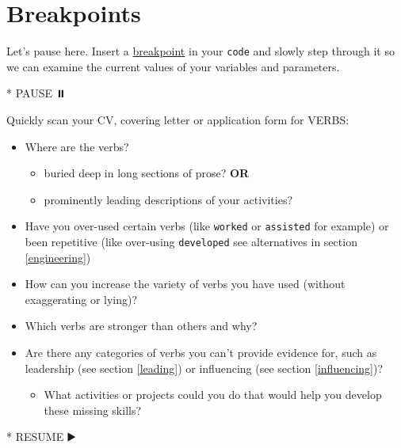 \documentclass[
]{book}
\newenvironment{Shaded}{\begin{snugshade}}{\end{snugshade}}
\newcommand{\NormalTok}[1]{#1}
\newcommand{\SpecialStringTok}[1]{\textcolor[rgb]{0.31,0.60,0.02}{#1}}
\providecommand{\tightlist}{%
  \setlength{\itemsep}{0pt}\setlength{\parskip}{0pt}}
\begin{document}
\hypertarget{bp17}{%
\section{Breakpoints}\label{bp17}}

Let's pause here. Insert a \href{https://en.wikipedia.org/wiki/Breakpoint}{breakpoint} in your \texttt{code} and slowly step through it so we can examine the current values of your variables and parameters.

\begin{Shaded}
\begin{Highlighting}[]
\SpecialStringTok{* }\NormalTok{PAUSE ⏸️}
\end{Highlighting}
\end{Shaded}

Quickly scan your CV, covering letter or application form for VERBS:

\begin{itemize}
\tightlist
\item
  Where are the verbs?

  \begin{itemize}
  \tightlist
  \item
    buried deep in long sections of prose? \textbf{OR}
  \item
    prominently leading descriptions of your activities?
  \end{itemize}
\item
  Have you over-used certain verbs (like \texttt{worked} or \texttt{assisted} for example) or been repetitive (like over-using \texttt{developed} see alternatives in section \ref{engineering})
\item
  How can you increase the variety of verbs you have used (without exaggerating or lying)?
\item
  Which verbs are stronger than others and why?
\item
  Are there any categories of verbs you can't provide evidence for, such as leadership (see section \ref{leading}) or influencing (see section \ref{influencing})?

  \begin{itemize}
  \tightlist
  \item
    What activities or projects could you do that would help you develop these missing skills?
  \end{itemize}
\end{itemize}

\begin{Shaded}
\begin{Highlighting}[]
\SpecialStringTok{* }\NormalTok{RESUME ▶️}
\end{Highlighting}
\end{Shaded}
\end{document}
